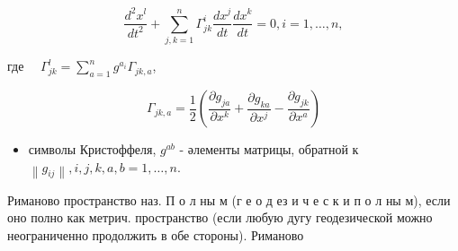 \documentclass[10pt]{article}
\begin{document}
\[

\frac{d^{2} x^{l}}{d t^{2}}+\sum_{j, k=1}^{n} \Gamma_{j k}^{i} \frac{d x^{j}}{d t} \frac{d x^{k}}{d t}=0, i=1, \ldots, n,

\]



где $\quad \Gamma_{j k}^{l}=\sum_{a=1}^{n} g^{a_{i}} \Gamma_{j k, a}$,



\[

\Gamma_{j k, a}=\frac{1}{2}\left(\frac{\partial g_{j a}}{\partial x^{k}}+\frac{\partial g_{k a}}{\partial x^{j}}-\frac{\partial g_{j k}}{\partial x^{a}}\right)

\]



\begin{itemize}

  \item символы Кристоффеля, $g^{a b}$ - әлементы матрицы, обратной к $\left\|g_{i j}\right\|, i, j, k, a, b=1, \ldots, n$.

\end{itemize}



Риманово пространство наз. П о л ны м (г е о д ез и ч е с к и п о л ны м), если оно полно как метрич. пространство (если любую дугу геодезической можно неограниченно продолжить в обе стороны). Риманово
\end{document}

